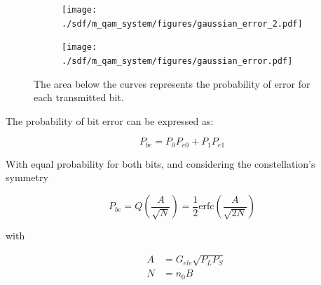 \begin{refsection}
\begin{figure}[H]
	\centering
	\begin{subfigure}{.5\textwidth}
		\centering
		\texttt{[image: ./sdf/m\_qam\_system/figures/gaussian\_error\_2.pdf]}
	\end{subfigure}%
	\begin{subfigure}{.5\textwidth}
		\centering
		\texttt{[image: ./sdf/m\_qam\_system/figures/gaussian\_error.pdf]}
	\end{subfigure}
	\caption{The area below the curves represents the probability of error for each transmitted bit.}
	\label{fig:gausserr}
\end{figure}

The probability of bit error can be expressed as:

\begin{equation}
P_{be} = P_0 P_{e0} + P_1 P_{e1}
\end{equation}

With equal probability for both bits, and considering the constellation's symmetry

\begin{equation}\label{eq:berMQAM}
P_{be} =  Q\left({\frac{A}{\sqrt{N}}}\right) = \frac{1}{2} \text{erfc}\left({\frac{A}{\sqrt{2 N}}}\right) 
\end{equation}





with


\begin{eqnarray}
&A &= G_{ele} \sqrt{P_L P_S}\label{eq:bpskamplitude}\\
&N & = n_0 B
\end{eqnarray}


\end{refsection}
